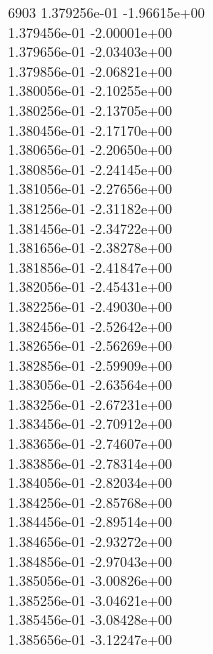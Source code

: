 6903	1.379256e-01	-1.96615e+00	\\ 	1.379456e-01	-2.00001e+00	\\ 	1.379656e-01	-2.03403e+00	\\ 	1.379856e-01	-2.06821e+00	\\ 	1.380056e-01	-2.10255e+00	\\ 	1.380256e-01	-2.13705e+00	\\ 	1.380456e-01	-2.17170e+00	\\ 	1.380656e-01	-2.20650e+00	\\ 	1.380856e-01	-2.24145e+00	\\ 	1.381056e-01	-2.27656e+00	\\ 	1.381256e-01	-2.31182e+00	\\ 	1.381456e-01	-2.34722e+00	\\ 	1.381656e-01	-2.38278e+00	\\ 	1.381856e-01	-2.41847e+00	\\ 	1.382056e-01	-2.45431e+00	\\ 	1.382256e-01	-2.49030e+00	\\ 	1.382456e-01	-2.52642e+00	\\ 	1.382656e-01	-2.56269e+00	\\ 	1.382856e-01	-2.59909e+00	\\ 	1.383056e-01	-2.63564e+00	\\ 	1.383256e-01	-2.67231e+00	\\ 	1.383456e-01	-2.70912e+00	\\ 	1.383656e-01	-2.74607e+00	\\ 	1.383856e-01	-2.78314e+00	\\ 	1.384056e-01	-2.82034e+00	\\ 	1.384256e-01	-2.85768e+00	\\ 	1.384456e-01	-2.89514e+00	\\ 	1.384656e-01	-2.93272e+00	\\ 	1.384856e-01	-2.97043e+00	\\ 	1.385056e-01	-3.00826e+00	\\ 	1.385256e-01	-3.04621e+00	\\ 	1.385456e-01	-3.08428e+00	\\ 	1.385656e-01	-3.12247e+00	\\ \hline
